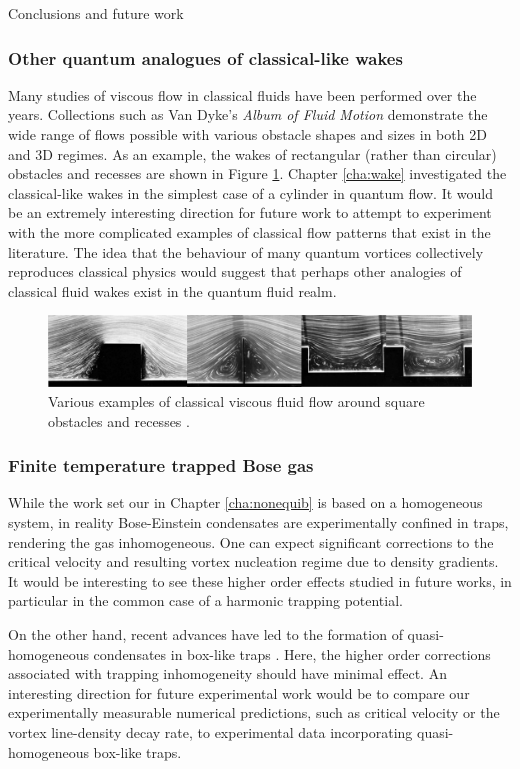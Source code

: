 \begin{chapter}{\label{cha:conc}Conclusions and future work}
\subsubsection{Other quantum analogues of classical-like wakes}
Many studies of viscous flow in classical fluids have been performed over the years. Collections such as Van Dyke's {\it Album of Fluid Motion} \cite{nagib} demonstrate the wide range of flows possible with various obstacle shapes and sizes in both 2D and 3D regimes. As an example, the wakes of rectangular (rather than circular) obstacles and recesses are shown in Figure \ref{fig:dyke-imgs}. Chapter \ref{cha:wake} investigated the classical-like wakes in the simplest case of a cylinder in quantum flow. It would be an extremely interesting direction for future work to attempt to experiment with the more complicated examples of classical flow patterns that exist in the literature. The idea that the behaviour of many quantum vortices collectively reproduces classical physics would suggest that perhaps other analogies of classical fluid wakes exist in the quantum fluid realm. 
\begin{figure}
\centering
    \includegraphics[width=\linewidth]{wake/square.png}
  \caption{Various examples of classical viscous fluid flow around square obstacles and recesses \cite{nagib}.} 
  \label{fig:dyke-imgs}
\end{figure}

\subsubsection{Finite temperature trapped Bose gas}
While the work set our in Chapter \ref{cha:nonequib} is based on a homogeneous system, in reality Bose-Einstein condensates are experimentally confined in traps, rendering the gas inhomogeneous. One can expect significant corrections to the critical velocity and resulting vortex nucleation regime due to density gradients. It would be interesting to see these higher order effects studied in future works, in particular in the common case of a harmonic trapping potential.

On the other hand, recent advances have led to the formation of quasi-homogeneous condensates in box-like traps \cite{gaunt_2013,chomaz_2015}. Here, the higher order corrections associated with trapping inhomogeneity should have minimal effect. An interesting direction for future experimental work would be to compare our experimentally measurable numerical predictions, such as critical velocity or the vortex line-density decay rate, to experimental data incorporating quasi-homogeneous box-like traps.


\end{chapter}
